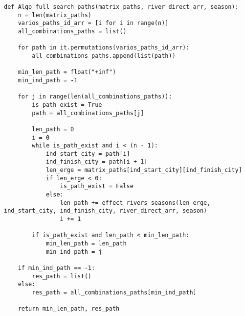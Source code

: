 \vspace{0.25cm}
\begin{lstlisting}[caption=реализации алгоритма коммивояжёра полным перебором, label=lst:full]
def Algo_full_search_paths(matrix_paths, river_direct_arr, season):
    n = len(matrix_paths)
    varios_paths_id_arr = [i for i in range(n)]
    all_combinations_paths = list()

    for path in it.permutations(varios_paths_id_arr):
        all_combinations_paths.append(list(path))

    min_len_path = float("+inf")
    min_ind_path = -1

    for j in range(len(all_combinations_paths)):
        is_path_exist = True
        path = all_combinations_paths[j]

        len_path = 0
        i = 0
        while is_path_exist and i < (n - 1):
            ind_start_city = path[i]
            ind_finish_city = path[i + 1]
            len_erge = matrix_paths[ind_start_city][ind_finish_city]
            if len_erge < 0:
                is_path_exist = False
            else:
                len_path += effect_rivers_seasons(len_erge, ind_start_city, ind_finish_city, river_direct_arr, season)
                i += 1
        
        if is_path_exist and len_path < min_len_path:
            min_len_path = len_path
            min_ind_path = j

    if min_ind_path == -1:
        res_path = list()
    else:
        res_path = all_combinations_paths[min_ind_path]
    
    return min_len_path, res_path
\end{lstlisting}

\vspace{0.25cm}


